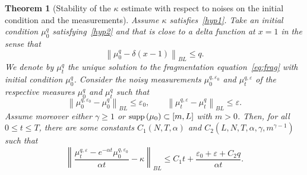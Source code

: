 \documentclass[10pt]{amsart}
\newtheorem{theo}{Theorem}[section]
\theoremstyle{definition}\newtheorem{defi}[theo]{Definition}\newtheorem{rema}[theo]{Remark}\newtheorem{exam}[theo]{Example}\newtheorem{exem}[theo]{Example}\newtheorem{nota}[theo]{Notation}
\newcommand*\eps{\varepsilon}
\renewcommand*\a{\alpha}
\newcommand*\supp{{\mbox{\small\rm supp}}\,}
\begin{document}
\begin{theo}[Stability of the $\kappa$ estimate with respect to noises on the initial condition and the measurements]\label{thm:stab}
Assume $\kappa$ satisfies~\eqref{hyp1}. Take an initial condition $\mu_0^{q}$ satisfying~\eqref{hyp2} and that is close to a delta function at $x=1$ in the sense that
\begin{equation*}
\left\|\mu_0^{q} - \delta(x-1)\right\|_{BL} \leq q.
\end{equation*}
We denote by $\mu_t^q$ the unique solution to the fragmentation equation~\eqref{eq:frag} with initial condition $\mu_0^{q}$. Consider the noisy measurements $\mu_0^{q,\eps_0}$ and $\mu_t^{q,\eps}$ of the respective measures $\mu_0^q$ and $\mu_t^q$ such that
\begin{equation*}
\left\|\mu_0^{q,\eps_0}- \mu_0^q\right\|_{BL} \leq \eps_0,\qquad
\left\|\mu_t^{q,\eps}- \mu_t^q\right\|_{BL} \leq \eps.
\end{equation*}
Assume moreover either $\gamma\geq 1$ or $\supp (\mu_0)\subset [m,L]$ with $m>0$. Then, for all $0\leq t\leq T$, there are some constants $C_1(N,T,\alpha)$ and $C_2(L,N,T,\alpha,\gamma,m^{\gamma-1})$ such that
\begin{equation}\label{thm:stabE4}
\left\|\frac{\mu_t^{q,\eps} - e^{-\a t} \mu_0^{q,\eps_0} }{\a t}-\kappa\right\|_{BL}
\leq C_1 t + \frac{\eps_0+\eps+ C_2 q}{\a t}.
\end{equation}
\end{theo}
\end{document}
